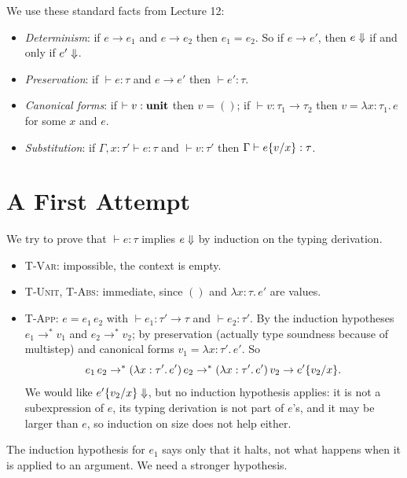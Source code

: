 \noindent We use these standard facts from Lecture 12:
\begin{itemize}
  \item \emph{Determinism}: if $e \to e_1$ and $e \to e_2$ then $e_1 = e_2$. So if
        $e \to e'$, then $e \Downarrow$ if and only if $e' \Downarrow$.
  \item \emph{Preservation}: if $\vdash e : \tau$ and $e \to e'$ then $\vdash e' : \tau$.
  \item \emph{Canonical forms}: if $\vdash v : \mathbf{unit}$ then $v = ()$; if
        $\vdash v : \tau_1 \to \tau_2$ then $v = \lambda x : \tau_1.\, e$ for some $x$
        and $e$.
  \item \emph{Substitution}: if $\Gamma, x : \tau' \vdash e : \tau$ and
        $\vdash v : \tau'$ then $\Gamma \vdash e\{v/x\} : \tau$.
\end{itemize}
 
\section{A First Attempt}
 
We try to prove that $\vdash e : \tau$ implies $e \Downarrow$ by induction on the typing
derivation.
\begin{itemize}
  \item \textsc{T-Var}: impossible, the context is empty.
  \item \textsc{T-Unit}, \textsc{T-Abs}: immediate, since $()$ and $\lambda x : \tau.\, e'$
        are values.
  \item \textsc{T-App}: $e = e_1\, e_2$ with $\vdash e_1 : \tau' \to \tau$ and
        $\vdash e_2 : \tau'$. By the induction hypotheses $e_1 \to^* v_1$ and
        $e_2 \to^* v_2$; by preservation (actually type soundness because of multistep) and canonical forms
        $v_1 = \lambda x : \tau'.\, e'$. So
        \[
        e_1\, e_2 \to^* (\lambda x : \tau'.\, e')\, e_2 \to^* (\lambda x : \tau'.\, e')\, v_2 \to e'\{v_2/x\}.
        \]
        We would like $e'\{v_2/x\} \Downarrow$, but no induction hypothesis applies:
        it is not a subexpression of $e$, its typing derivation is not part of $e$'s,
        and it may be larger than $e$, so induction on size does not help either.
\end{itemize}
The induction hypothesis for $e_1$ says only that it halts, not what happens when it
is applied to an argument. We need a stronger hypothesis.
 
